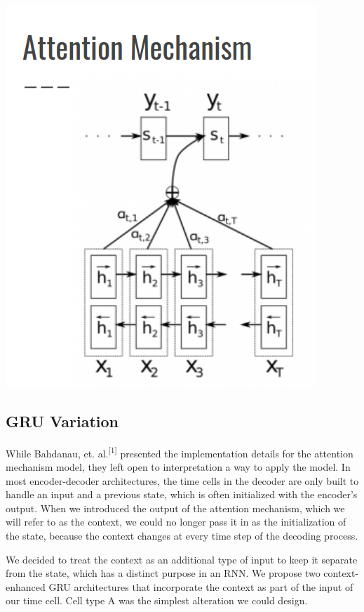 \documentclass[letterpaper, 10pt]{article}
\begin{document}
\begin{multicols}{2}
\begin{center}
\includegraphics[scale=.3]{attention_mechanism}
\end{center}

\subsection{GRU Variation}
While Bahdanau, et. al.\textsuperscript{[1]} presented the implementation details for the attention
mechanism model, they left open to interpretation a way to apply the model.
In most encoder-decoder architectures, the time cells in the decoder are only built to handle an
input and a previous state, which is often initialized with the encoder’s output.
When we introduced the output of the attention mechanism, which we will refer to as the context,
we could no longer pass it in as the initialization of the state, because the context changes at
every time step of the decoding process.

We decided to treat the context as an additional type of input to keep it separate from the state,
which has a distinct purpose in an RNN.
We propose two context-enhanced GRU architectures that incorporate the context as part of the input
of our time cell.
Cell type A was the simplest alteration we could design.


\end{multicols}
\end{document}
